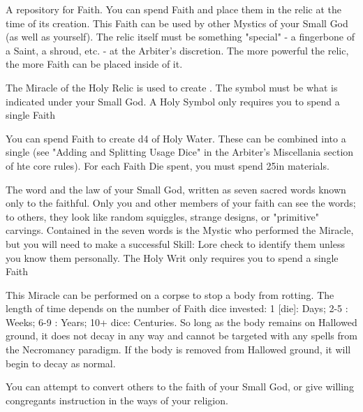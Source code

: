 {

A repository for Faith.  You can spend \DICE Faith and place them in the relic at the time of its creation.  This Faith can be used by other Mystics of your Small God (as well as yourself).  The relic itself must be something "special" - a fingerbone of a Saint, a shroud, etc.  - at the Arbiter's discretion.  The more powerful the relic, the more Faith can be placed inside of it.

The Miracle of the Holy Relic is used to create .  The symbol must be what is indicated under your Small God.  A Holy Symbol only requires you to spend a single Faith \POOL



You can spend \DICE Faith to create \DICE d4 \UD of Holy Water.  These \UD can be combined into a single \UD (see "Adding and Splitting Usage Dice" in the Arbiter's Miscellania section of hte core rules). For each Faith Die spent, you must spend 25\AG in materials.


The word and the law of your Small God, written as seven sacred words known only to the faithful.  Only you and other members of your faith can see the words; to others, they look like random squiggles, strange designs, or "primitive" carvings.  Contained in the seven words is the Mystic who performed the Miracle, but you will need to make a successful Skill: Lore check to identify them unless you know them personally.   The Holy Writ only requires you to spend a single Faith \POOL



This Miracle can be performed on a corpse to stop a body from rotting.  The length of time depends on the number of Faith dice invested:  1 [die]: \SUMDICE Days; 2-5 \DICE: \SUMDICE Weeks; 6-9 \DICE: \SUMDICE Years; 10+ dice: \SUMDICE Centuries.  So long as the body remains on Hallowed ground, it does not decay in any way and cannot be targeted with any spells from the Necromancy paradigm.  If the body is removed from Hallowed ground, it will begin to decay as normal.


You can attempt to convert others to the faith of your Small God, or give willing congregants instruction in the ways of your religion.  

}
